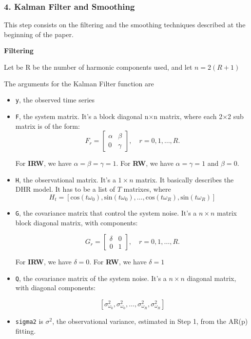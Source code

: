 \documentclass{article}\usepackage[]{graphicx}\usepackage[]{color}
\begin{document}
\newpage

\subsubsection*{4. Kalman Filter and Smoothing}
This step consists on the filtering and the smoothing techniques described at the beginning of the paper. 

\vspace{0.3cm}

\textbf{Filtering}

Let be R be the number of harmonic components used, and let $n = 2(R + 1)$

The arguments for the Kalman Filter function are

\begin{itemize}
\item \texttt{y}, the observed time series
\item \texttt{F}, the system matrix. It's a block diagonal n$\times$n matrix, where each 2$\times$2 sub matrix is of the form:
\[ F_r = 
\begin{bmatrix} \alpha & \beta    \\ 0 & \gamma   \end{bmatrix}, \quad r = 0, 1, \dots, R.
\]

For \textbf{IRW}, we have $\alpha = \beta = \gamma = 1$. For \textbf{RW}, we have $\alpha = \gamma = 1$ and $\beta = 0$.

\item \texttt{H}, the observational matrix. It's a $ 1 \times n$ matrix. It basically describes the DHR model. It has to be a list of $T$ matrixes, where $$
H_t = [ \text{cos}(t \omega_0), \text{sin}(t \omega_0), \dots, \text{cos}(t \omega_R), \text{sin}(t \omega_R)] $$

\item \texttt{G}, the covariance matrix that control the system noise. It's a $n\times n$ matrix block diagonal matrix, with components:

\[ G_r = 
\begin{bmatrix} \delta & 0    \\ 0 & 1   \end{bmatrix}, \quad r = 0, 1, \dots, R.
\]

For \textbf{IRW}, we have $\delta = 0$. For \textbf{RW}, we have $\delta = 1$



\item \texttt{Q}, the covariance matrix of the system noise. It's a $n \times n$ diagonal matrix, with diagonal components:

$$ [\sigma^2_{\omega_0}, \sigma^2_{\omega_0},\dots, \sigma^2_{\omega_R}, \sigma^2_{\omega_R} ] $$

\item \texttt{sigma2} is $\sigma^2$, the observational variance, estimated in Step 1, from the AR(p) fitting.  

\end{itemize}
\end{document}
